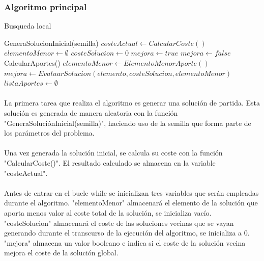 \documentclass{article}
\begin{document}
	\subsubsection{Algoritmo principal}
	\begin{algorithm}[H]
		\caption{Busqueda local}
		\begin{algorithmic}
			\STATE GeneraSolucionInicial(semilla)
			\STATE $costeActual \leftarrow CalcularCoste()$
			\STATE $elementoMenor \leftarrow \emptyset$
			\STATE $costeSolucion \leftarrow 0$
			\STATE $mejora \leftarrow true$
			\STATE $mejora \leftarrow false$
			\STATE CalcularAportes()
			\STATE $elementoMenor \leftarrow ElementoMenorAporte()$
			\STATE $mejora \leftarrow EvaluarSolucion(elemento, costeSolucion, elementoMenor)$
			\ENDIF
			\ENDFOR
			\STATE $listaAportes \leftarrow \emptyset$
			\ENDWHILE
		\end{algorithmic}
	\end{algorithm}

	\paragraph{} La primera tarea que realiza el algoritmo es generar una solución de partida. Esta solución es generada de manera aleatoria con la función "GeneraSoluciónInicial(semilla)", haciendo uso de la semilla que forma parte de los parámetros del problema.
	
	\paragraph{}Una vez generada la solución inicial, se calcula su coste con la función "CalcularCoste()". El resultado calculado se almacena en la variable "costeActual".
	
	\paragraph{}Antes de entrar en el bucle while se inicializan tres variables que serán empleadas durante el algoritmo. "elementoMenor" almacenará el elemento de la solución que aporta menos valor al coste total de la solución, se inicializa vacío. "costeSolucion" almacenará el coste de las soluciones vecinas que se vayan generando durante el transcurso de la ejecución del algoritmo, se inicializa a 0. "mejora" almacena un valor booleano e indica si el coste de la solución vecina mejora el coste de la solución global.
	
\end{document}
